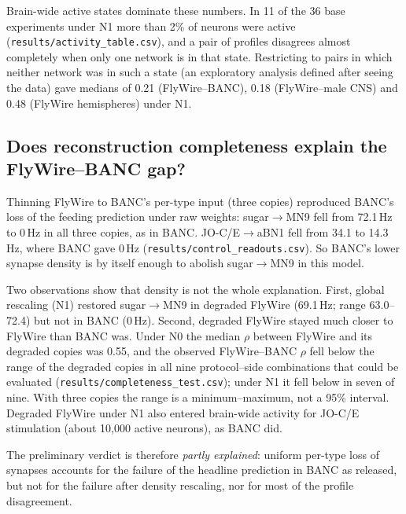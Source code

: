 Brain-wide active states dominate these numbers. In 11 of the 36 base experiments under N1
more than 2\% of neurons were active (\texttt{results/activity\_table.csv}), and a pair of
profiles disagrees almost completely when only one network is in that state. Restricting to
pairs in which neither network was in such a state (an exploratory analysis defined after
seeing the data) gave medians of 0.21 (FlyWire--BANC), 0.18 (FlyWire--male CNS) and 0.48
(FlyWire hemispheres) under N1.

\subsection*{Does reconstruction completeness explain the FlyWire--BANC gap?}
Thinning FlyWire to BANC's per-type input (three copies) reproduced BANC's loss of the
feeding prediction under raw weights: sugar$\to$MN9 fell from 72.1\,Hz to 0\,Hz in all
three copies, as in BANC. JO-C/E$\to$aBN1 fell from 34.1 to 14.3\,Hz, where BANC gave
0\,Hz (\texttt{results/control\_readouts.csv}). So BANC's lower synapse density is by itself
enough to abolish sugar$\to$MN9 in this model.

Two observations show that density is not the whole explanation. First, global rescaling
(N1) restored sugar$\to$MN9 in degraded FlyWire (69.1\,Hz; range 63.0--72.4) but not in BANC
(0\,Hz). Second, degraded FlyWire stayed much closer to FlyWire than BANC was. Under N0 the
median $\rho$ between FlyWire and its degraded copies was 0.55, and the observed
FlyWire--BANC $\rho$ fell below the range of the degraded copies in all nine protocol--side
combinations that could be evaluated (\texttt{results/completeness\_test.csv}); under N1 it
fell below in seven of nine. With three copies the range is a minimum--maximum, not a 95\%
interval. Degraded FlyWire under N1 also entered brain-wide activity for JO-C/E stimulation
(about 10{,}000 active neurons), as BANC did.

The preliminary verdict is therefore \emph{partly explained}: uniform per-type loss of
synapses accounts for the failure of the headline prediction in BANC as released, but not
for the failure after density rescaling, nor for most of the profile disagreement.

